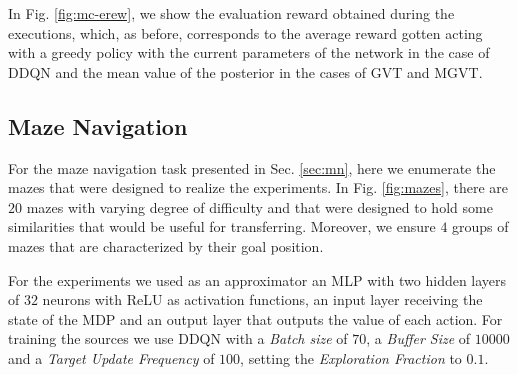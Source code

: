 \documentclass{article}
\begin{document}
In Fig. \ref{fig:mc-erew}, we show the evaluation reward obtained during the executions, which, as before, corresponds to the average reward gotten acting with a greedy policy with the current parameters of the network in the case of DDQN and the mean value of the posterior in the cases of GVT and MGVT. 

\subsection{Maze Navigation}

For the maze navigation task presented in Sec. \ref{sec:mn}, here we enumerate the mazes that were designed to realize the experiments. In Fig. \ref{fig:mazes}, there are $20$ mazes with varying degree of difficulty and that were designed to hold some similarities that would be useful for transferring. Moreover, we ensure $4$ groups of mazes that are characterized by their goal position. 

For the experiments we used as an approximator an MLP with two hidden layers of $32$ neurons with ReLU as activation functions, an input layer receiving the state of the MDP and an output layer that outputs the value of each action. For training the sources we use DDQN with a \textit{Batch size} of $70$, a \textit{Buffer Size} of $10000$ and a \textit{Target Update Frequency} of $100$, setting the \textit{Exploration Fraction} to $0.1$.
\end{document}
